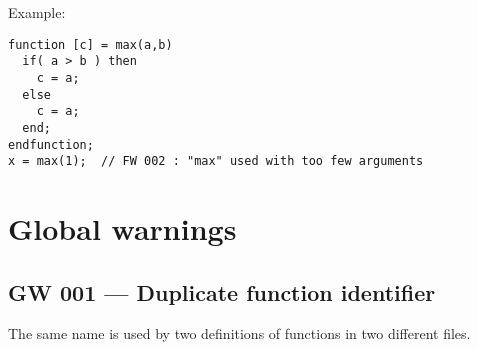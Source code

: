\documentclass{article}
\begin{document}
Example:
\begin{verbatim}
function [c] = max(a,b)
  if( a > b ) then
    c = a;
  else
    c = a;
  end;
endfunction;
x = max(1);  // FW 002 : "max" used with too few arguments
\end{verbatim}

\section{Global warnings}

\subsection{GW 001 --- Duplicate function identifier}

The same name is used by two definitions of functions in two different
files.
\end{document}
